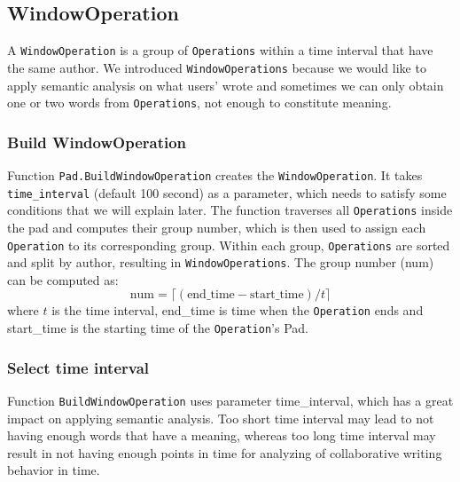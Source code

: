 \subsection{WindowOperation}
    \label{sub:winOp}
    A \texttt{WindowOperation} is a group of \texttt{Operations} within a time interval that have the same author. We introduced \texttt{WindowOperations} because we would like to apply semantic analysis on what users' wrote and sometimes we can only obtain one or two words from \texttt{Operations},  not enough to constitute meaning. 
    
    \subsubsection{Build WindowOperation}
    Function \texttt{Pad.BuildWindowOperation} creates the \texttt{WindowOperation}. It takes \texttt{time\_interval} (default 100 second) as a parameter, which needs to satisfy some conditions that we will explain later. The function traverses all \texttt{Operations} inside the pad and computes their group number, which is then used to assign each \texttt{Operation} to its corresponding group. Within each group,  \texttt{Operations} are sorted and split by author, resulting in  \texttt{WindowOperations}. The group number (num) can be computed as:
        \begin{equation}\label{eq:group_number}
            \text{num} = \lceil(\text{end\_time} - \text{start\_time})/t\rceil
        \end{equation}
      where $t$ is the time interval, end\_time is time when the \texttt{Operation} ends and start\_time is the starting time of the \texttt{Operation}'s Pad.

      \subsubsection{Select time interval}
      \label{sub:time_interval}
      Function \texttt{BuildWindowOperation} uses parameter time\_interval, which has a great impact on applying semantic analysis. Too short time interval may lead to not having enough words that have a meaning, whereas too long time interval may result in not having enough points in time for analyzing of collaborative writing behavior in time.
      
